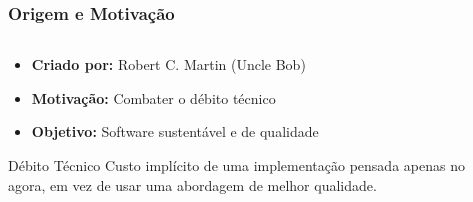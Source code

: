 \documentclass[aspectratio=169]{beamer}
\begin{document}
\begin{frame}
\frametitle{Origem e Motivação}
\begin{columns}
\begin{column}{0.6\textwidth}
\begin{itemize}
    \item \textbf{Criado por:} Robert C. Martin (Uncle Bob)
    \item \textbf{Motivação:} Combater o débito técnico
    \item \textbf{Objetivo:} Software sustentável e de qualidade
\end{itemize}

\vspace{0.5cm}
\begin{block}{Débito Técnico}
Custo implícito de uma implementação pensada apenas no agora, em vez de usar uma abordagem de melhor qualidade.
\end{block}
\end{column}

\begin{column}{0.4\textwidth}
\begin{center}
\end{center}
\end{column}
\end{columns}
\end{frame}

    
    
\end{document}
